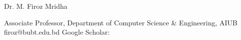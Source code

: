 

\begin{cventries}

  \cventry
    {} %
    {Dr. M. Firoz Mridha} %
    {} %
    {} %
    {
      \begin{cvnob} %
        \item {Associate Professor,
            Department of Computer Science \& Engineering, AIUB \newline 
            firoz@bubt.edu.bd \newline
            Google Scholar: {}
        }
      \end{cvnob}
    }

\end{cventries}
